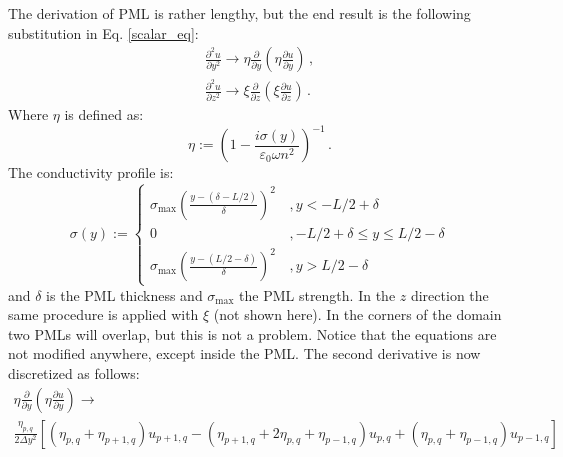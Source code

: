 \documentclass[]{article}
\begin{document}
	The derivation of PML is rather lengthy, but the end result is the following substitution in Eq. \eqref{scalar_eq}:
	\begin{subequations}
		\begin{align}
			\frac{\partial^2 u}{\partial y^2} \to \eta \frac{\partial}{\partial y}\left(  \eta \frac{\partial u}{\partial y}\right) \, ,\\
			\frac{\partial^2 u}{\partial z^2} \to \xi \frac{\partial}{\partial z}\left(  \xi \frac{\partial u}{\partial z}\right) \, .
		\end{align}
	\end{subequations}
	Where $\eta$ is defined as:
	\begin{equation}
		\eta := \left(1-\frac{i\sigma(y)}{\varepsilon_0 \omega n^2} \right)^{-1}\, .
	\end{equation}
	The conductivity profile is:
	\begin{equation}
		\sigma(y):= \begin{cases}
			\sigma_{\text{max}}\left( \frac{y-(\delta-L/2)}{\delta}\right)^2 \, &, y <-L/2+\delta\\
			0&, -L/2+\delta \le y \le L/2 - \delta\\
			\sigma_{\text{max}}\left( \frac{y-(L/2-\delta)}{\delta}\right)^2 \, &, y > L/2 - \delta
		\end{cases}
	\end{equation}
	and $\delta$ is the PML thickness and $\sigma_{\text{max}}$ the PML strength. In the $z$ direction the same procedure is applied with $\xi$ (not shown here). In the corners of the domain two PMLs will overlap, but this is not a problem. Notice that the equations are not modified anywhere, except inside the PML. The second derivative is now discretized as follows:
	\begin{multline}
		\eta \frac{\partial}{\partial y}\left(  \eta \frac{\partial u}{\partial y}\right)  \to\\
		\frac{\eta_{p,q}}{2\Delta y^2}\left[(\eta_{p,q}+\eta_{p+1,q})u_{p+1,q} -(\eta_{p+1,q}+2\eta_{p,q}+\eta_{p-1,q})u_{p,q}+(\eta_{p,q}+\eta_{p-1,q})u_{p-1,q}\right] 
	\end{multline}
	
	
	
	
	
	
\end{document}

